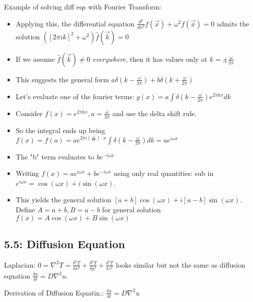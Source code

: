 \documentclass[11pt, oneside]{article}   	%
\begin{document}
Example of solving diff eqs with Fourier Transform:
\begin{itemize}
\item Applying this, the differential equation $\frac{d^2}{dx^2}f(\vec{x}) + \omega^2 f(\vec{x}) = 0$ admits the solution $([2\pi i k]^2 + \omega^2) \hat{f}(\vec{k}) = 0$
\item If we assume $\hat{f}(\vec{k}) \neq 0$ \emph{everywhere}, then it has values only at $k = \pm \frac{\omega}{2\pi}$
\item This suggests the general form $a \delta(k-\frac{\omega}{2\pi}) + b \delta(k+\frac{\omega}{2\pi})$
\item Let's evaluate one of the fourier terms: $g(x) =a \int \delta(k-\frac{\omega}{2\pi}) e^{2\pi k x} dk$
\item Consider $f(x) =e^{2\pi k x}, a = \frac{\omega}{2\pi}$ and use the delta shift rule.
\item So the integral ends up being $f(x) = f(a) = a e^{2\pi i (\frac{\omega}{2\pi})\cdot x}\int \delta(k-\frac{\omega}{2\pi})dk = ae^{i\omega x}$
\item The "b" term evaluates to $be^{-i \omega x}$
\item Writing $f(x) = ae^{i\omega x} + be^{-i\omega x}$ using only real quantities: sub in $e^{i\omega x} = \cos(\omega x) + i\sin(\omega x)$.
\item This yields the general solution $[a+b]\cos(\omega x) + i[a-b]\sin(\omega x).$  Define $A = a+b, B  =a-b$ for general solution $f(x) = A\cos(\omega x) + B\sin(\omega x)$
\end{itemize}


\subsection{5.5: Diffusion Equation}

 Laplacian: $0 = \nabla ^2 T = \frac{\delta ^2 T}{\delta x^2} +  \frac{\delta ^2 T}{\delta y^2} +  \frac{\delta ^2 T}{\delta z^2}$ looks similar but not the same as diffusion equation $\frac{\delta u}{\delta t} = D\nabla^2 u$.

Derivation of Diffusion Equatin.: $ \frac{\delta u}{\delta t }= D\nabla^2 u$
\end{document}
